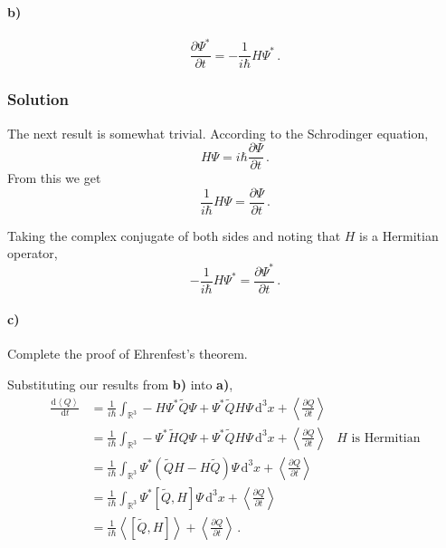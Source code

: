 \documentclass[letterpaper,10pt]{article}
\def\expect#1{\left\langle #1\right\rangle}
\def\d{\mathrm{d}}
\def\mbb{\mathbb}
\begin{document}
\paragraph*{b)}
\[
\frac{\partial\Psi^*}{\partial t}=-\frac{1}{i\hbar}H\Psi^*\,.
\]
\subsubsection*{Solution}
The next result is somewhat trivial. According to the Schrodinger equation,
\[
H\Psi=i\hbar\frac{\partial\Psi}{\partial t}\,.
\]
From this we get
\[
\frac{1}{i\hbar}H\Psi=\frac{\partial\Psi}{\partial t}\,.
\]

Taking the complex conjugate of both sides and noting that $H$ is a Hermitian
operator,
\[
-\frac{1}{i\hbar}H\Psi^*=\frac{\partial\Psi^*}{\partial t}\,.
\]
\paragraph*{c)} Complete the proof of Ehrenfest's theorem.

Substituting our results from \textbf{b)} into \textbf{a)},
\begin{align*}
\frac{\d\expect{Q}}{\d t}&=\frac{1}{i\hbar}\int_{\mbb{R}^3}
-H\Psi^*\tilde Q\Psi+\Psi^*\tilde QH\Psi\,\d^3x
+\expect{\frac{\partial Q}{\partial t}}\\
&=\frac{1}{i\hbar}\int_{\mbb{R}^3}
-\Psi^*\tilde HQ\Psi+\Psi^*\tilde QH\Psi\,\d^3x
+\expect{\frac{\partial Q}{\partial t}}&H\text{ is Hermitian}\\
&=\frac{1}{i\hbar}\int_{\mbb{R}^3}\Psi^*(\tilde QH-H\tilde Q)\Psi\,\d^3x
+\expect{\frac{\partial Q}{\partial t}}\\
&=\frac{1}{i\hbar}\int_{\mbb{R}^3}\Psi^*[\tilde Q,H]\Psi\,\d^3x
+\expect{\frac{\partial Q}{\partial t}}\\
&=\frac{1}{i\hbar}\expect{[\tilde Q,H]}
+\expect{\frac{\partial Q}{\partial t}}\,.
\end{align*}
\end{document}
